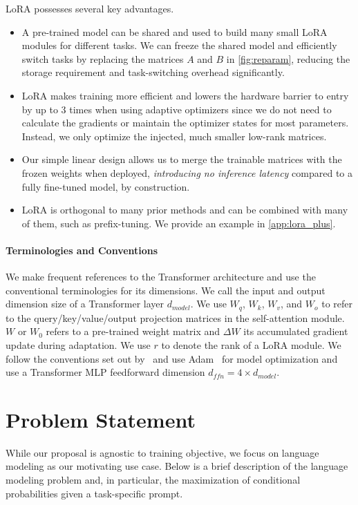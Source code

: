 \documentclass{article} %
\begin{document}
LoRA possesses several key advantages.
\begin{itemize}[topsep=6pt,itemsep=3pt,partopsep=4pt, parsep=4pt]
\item
A pre-trained model can be shared and used to build many small LoRA modules for different tasks.
We can freeze the shared model and efficiently switch tasks by replacing the matrices $A$ and $B$ in \autoref{fig:reparam}, reducing the storage requirement and task-switching overhead significantly.

\item
LoRA makes training more efficient and lowers the hardware barrier to entry by up to 3 times when using adaptive optimizers since we do not need to calculate the gradients or maintain the optimizer states for most parameters.
Instead, we only optimize the injected, much smaller low-rank matrices.%


\item
Our simple linear design allows us to merge the trainable matrices with the frozen weights when deployed, \textit{introducing no inference latency} compared to a fully fine-tuned model, by construction.

\item
LoRA is orthogonal to many prior methods and can be combined with many of them, such as prefix-tuning. We provide an example in \autoref{app:lora_plus}.

\end{itemize}

\paragraph{Terminologies and Conventions}
We make frequent references to the Transformer architecture and use the conventional terminologies for its dimensions.
We call the input and output dimension size of a Transformer layer $d_{model}$.
We use $W_q$, $W_k$, $W_v$, and $W_o$ to refer to the query/key/value/output projection matrices in the self-attention module.
$W$ or $W_0$ refers to a pre-trained weight matrix and $\Delta W$ its accumulated gradient update during adaptation.
We use $r$ to denote the rank of a LoRA module.
We follow the conventions set out by~\citep{vaswani2017attention, brown_language_2020} and use Adam~\citep{loshchilov2019decoupled, kingma2017adam} for model optimization and use a Transformer MLP feedforward dimension $d_{ffn} = 4 \times d_{model}$.



\section{Problem Statement}
\label{sec:problem_statement}
While our proposal is agnostic to training objective, we focus on language modeling as our motivating use case.
Below is a brief description of the language modeling problem and, in particular, the maximization of conditional probabilities given a task-specific prompt.
\end{document}
